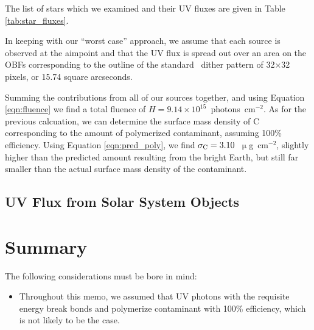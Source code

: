 \documentclass[11pt]{article}
\begin{document}
The list of stars which we examined and their UV fluxes are given in Table \ref{tab:star_fluxes}.

In keeping with our ``worst case'' approach, we assume that each source is observed at the aimpoint and that the UV flux is spread out over
an area on the OBFs corresponding to the outline of the standard \chandra~dither pattern of 32$\times$32 pixels, or 15.74 square arcseconds.

Summing the contributions from all of our sources together, and using Equation \ref{eqn:fluence} we find a total fluence of
$H = 9.14 \times 10^{15}$~photons~cm$^{-2}$. As for the previous calcuation, we can determine the surface mass density of C corresponding
to the amount of polymerized contaminant, assuming 100\% efficiency. Using Equation \ref{eqn:pred_poly}, we find
$\sigma_{\rm C} = 3.10$~$\upmu$g~cm$^{-2}$, slightly higher than the predicted amount resulting from the bright Earth, but still far smaller
than the actual surface mass density of the contaminant.

\subsection{UV Flux from Solar System Objects}

\section{Summary}

The following considerations must be bore in mind:

\begin{itemize}
\item Throughout this memo, we assumed that UV photons with the requisite energy break bonds and polymerize contaminant with 100\% efficiency, which
is not likely to be the case.
\end{itemize}
\end{document}
